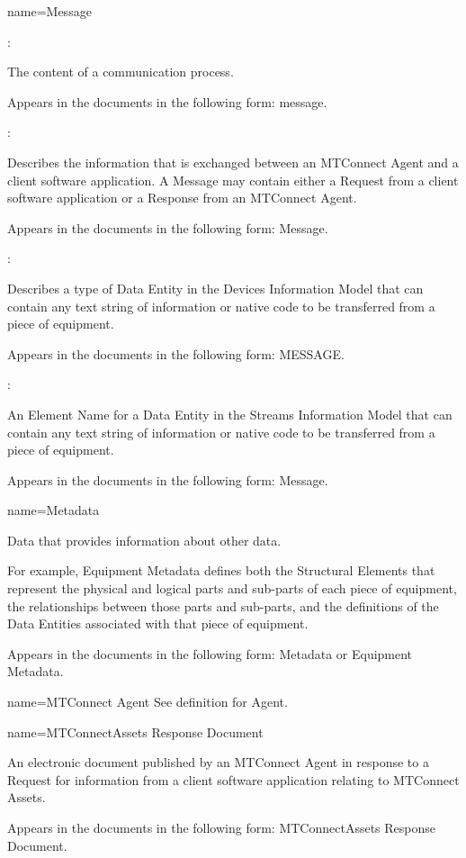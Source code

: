 {
  name={Message}
}
{
	:

	The content of a communication process.

	Appears in the documents in the following form: message.

	:

	Describes the information that is exchanged between an MTConnect Agent and a client software application.  A Message may contain either a Request from a client software application or a Response from an MTConnect Agent.

	Appears in the documents in the following form: Message.

	:

	Describes a type of Data Entity in the Devices Information Model that can contain any text string of information or native code to be transferred from a piece of equipment.

	Appears in the documents in the following form: MESSAGE.

	:

	An Element Name for a Data Entity in the Streams Information Model that can contain any text string of information or native code to be transferred from a piece of equipment.

	Appears in the documents in the following form:  Message.
}


{
  name={Metadata}
}
{
	Data that provides information about other data.

	For example, Equipment Metadata defines both the Structural Elements that represent the physical and logical parts and sub-parts of each piece of equipment, the relationships between those parts and sub-parts, and the definitions of the Data Entities associated with that piece of equipment.

	Appears in the documents in the following form: Metadata or Equipment Metadata.
}


{
  name={MTConnect Agent}
}
{
	See definition for Agent.
}


{
  name={MTConnectAssets Response Document}
}
{
	An electronic document published by an MTConnect Agent in response to a Request for information from a client software application relating to MTConnect Assets.

	Appears in the documents in the following form: MTConnectAssets Response Document.
}


